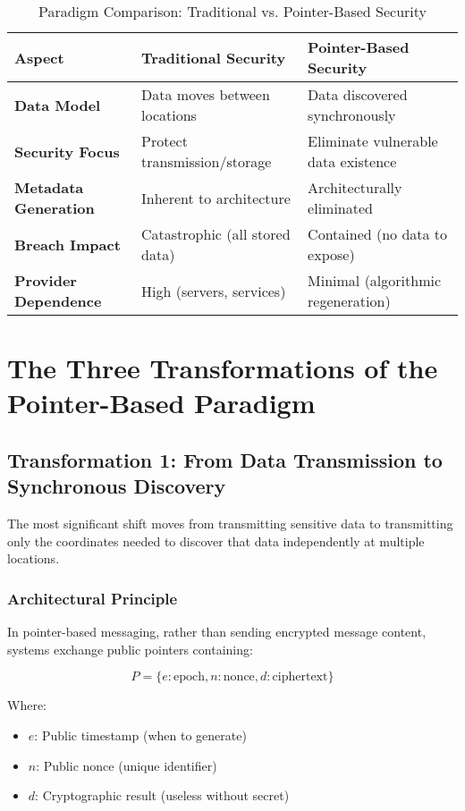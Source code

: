 \documentclass[11pt,a4paper]{article}
\begin{document}
\begin{table}[h]
\centering
\caption{Paradigm Comparison: Traditional vs. Pointer-Based Security}
\begin{tabularx}{\textwidth}{|l|X|X|}
\hline
\textbf{Aspect} & \textbf{Traditional Security} & \textbf{Pointer-Based Security} \\
\hline
\textbf{Data Model} & Data moves between locations & Data discovered synchronously \\
\hline
\textbf{Security Focus} & Protect transmission/storage & Eliminate vulnerable data existence \\
\hline
\textbf{Metadata Generation} & Inherent to architecture & Architecturally eliminated \\
\hline
\textbf{Breach Impact} & Catastrophic (all stored data) & Contained (no data to expose) \\
\hline
\textbf{Provider Dependence} & High (servers, services) & Minimal (algorithmic regeneration) \\
\hline
\end{tabularx}
\end{table}

\section{The Three Transformations of the Pointer-Based Paradigm}

\subsection{Transformation 1: From Data Transmission to Synchronous Discovery}

The most significant shift moves from transmitting sensitive data to transmitting only the coordinates needed to discover that data independently at multiple locations.

\subsubsection{Architectural Principle}

In pointer-based messaging, rather than sending encrypted message content, systems exchange public pointers containing:

\begin{equation}
P = \{e: \text{epoch}, n: \text{nonce}, d: \text{ciphertext}\}
\end{equation}

Where:
\begin{itemize}
    \item $e$: Public timestamp (when to generate)
    \item $n$: Public nonce (unique identifier)
    \item $d$: Cryptographic result (useless without secret)
\end{itemize}
\end{document}

